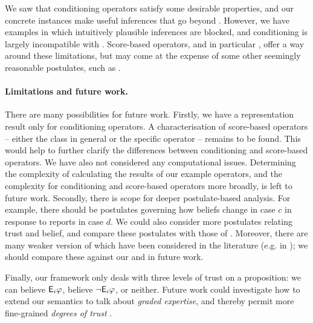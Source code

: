 We saw that conditioning operators satisfy some desirable
properties, and our concrete instances make useful inferences that go
beyond \weakop{}. However, we have examples in which intuitively plausible
inferences are blocked, and conditioning is largely incompatible with
\strongcondsucc{}. Score-based operators, and in particular \scorebasedop{},
offer a way around these limitations, but may
come at the expense of some other seemingly reasonable postulates, such as
\duprem{}.

\paragraph{Limitations and future work.}
There are many possibilities for future work.
%
Firstly, we have a representation result only for conditioning operators. A
characterisation of score-based operators -- either the class in general or the
specific operator \scorebasedop{} -- remains to be found. This would help to
further clarify the differences between conditioning and score-based operators.
%
We have also not considered any computational issues. Determining the
complexity of calculating the results of our example operators, and the
complexity for conditioning and score-based operators more broadly, is left to
future work.
%
Secondly, there is scope for deeper postulate-based analysis. For example,
there should be postulates governing how beliefs change in case $c$ in response
to reports in case $d$. We could also consider more postulates relating trust
and belief, and compare these postulates with those of \textcite{yasser_21}.
Moreover, there are many weaker version of  which have
been considered in the literature (e.g. in
\cite{ferme1999selective,hansson_2001,booth_trust_2018}); we should compare
these against our \condsucc{} and \strongcondsucc{} in future work.

Finally, our framework only deals with three levels of trust on a proposition:
we can believe $\mathsf{E}_i\varphi$, believe $\neg \mathsf{E}_i\varphi$, or neither.
Future work could investigate how to extend our semantics to talk about \emph{graded
expertise}, and thereby permit more fine-grained \emph{degrees of trust}
\cite{hunter_building_21,yasser_21,delgrande2006iterated}.
